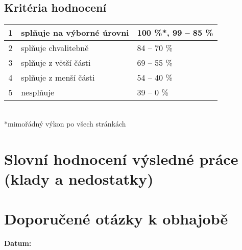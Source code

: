 \documentclass[a4paper,10pt]{article}
\begin{document}
\begin{center}
\end{center}

\subsection*{\sffamily\centering Kritéria hodnocení}
\begin{center}
 \begin{tabular}{c|l|l}
  1 & splňuje na výborné úrovni & 100 \%*, 99 -- 85 \% \\
  \midrule
  2 & splňuje chvalitebně & 84 -- 70 \% \\
  \midrule
  3 & splňuje z větší části & 69 -- 55 \% \\
  \midrule
  4 & splňuje z menší části & 54 -- 40 \% \\
  \midrule
  5 & nesplňuje & 39 -- 0 \%
 \end{tabular}\\
 *\footnotesize{mimořádný výkon po všech stránkách}
\end{center}

\section*{\sffamily \centering Slovní hodnocení výsledné práce (klady a
nedostatky)}

\section*{\sffamily \centering Doporučené otázky k obhajobě}

\begin{enumerate}
\end{enumerate}

\vfill

\textbf{Datum:
}
\end{document}
